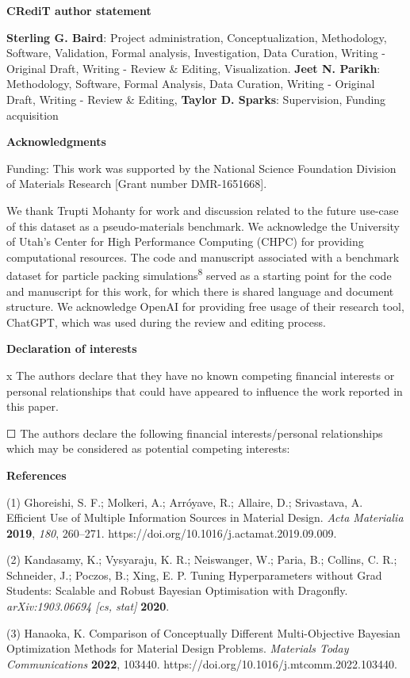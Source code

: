 \textbf{CRediT author statement}

\textbf{Sterling G. Baird}: Project administration, Conceptualization,
Methodology, Software, Validation, Formal analysis, Investigation, Data
Curation, Writing - Original Draft, Writing - Review \& Editing,
Visualization. \textbf{Jeet N. Parikh}: Methodology, Software, Formal
Analysis, Data Curation, Writing - Original Draft, Writing - Review \&
Editing, \textbf{Taylor D. Sparks}: Supervision, Funding acquisition

\textbf{Acknowledgments}

Funding: This work was supported by the National Science Foundation
Division of Materials Research {[}Grant number DMR-1651668{]}.

We thank Trupti Mohanty for work and discussion related to the future
use-case of this dataset as a pseudo-materials benchmark. We acknowledge
the University of Utah's Center for High Performance Computing (CHPC)
for providing computational resources. The code and manuscript
associated with a benchmark dataset for particle packing
simulations\textsuperscript{8} served as a starting point for the code
and manuscript for this work, for which there is shared language and
document structure. We acknowledge OpenAI for providing free usage of
their research tool, ChatGPT, which was used during the review and
editing process.

\textbf{Declaration of interests}

x The authors declare that they have no known competing financial
interests or personal relationships that could have appeared to
influence the work reported in this paper.

☐ The authors declare the following financial interests/personal
relationships which may be considered as potential competing interests:

\textbf{References}

(1) Ghoreishi, S. F.; Molkeri, A.; Arróyave, R.; Allaire, D.;
Srivastava, A. Efficient Use of Multiple Information Sources in Material
Design. \emph{Acta Materialia} \textbf{2019}, \emph{180}, 260--271.
https://doi.org/10.1016/j.actamat.2019.09.009.

(2) Kandasamy, K.; Vysyaraju, K. R.; Neiswanger, W.; Paria, B.; Collins,
C. R.; Schneider, J.; Poczos, B.; Xing, E. P. Tuning Hyperparameters
without Grad Students: Scalable and Robust Bayesian Optimisation with
Dragonfly. \emph{arXiv:1903.06694 {[}cs, stat{]}} \textbf{2020}.

(3) Hanaoka, K. Comparison of Conceptually Different Multi-Objective
Bayesian Optimization Methods for Material Design Problems.
\emph{Materials Today Communications} \textbf{2022}, 103440.
https://doi.org/10.1016/j.mtcomm.2022.103440.

